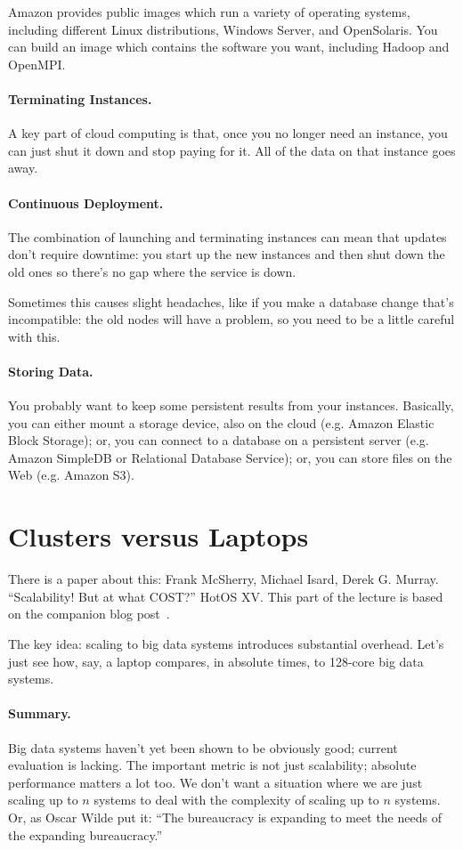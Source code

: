 \documentclass[a4paper]{report}
\begin{document}
Amazon provides public images which run a variety of operating
systems, including different Linux distributions, Windows Server, and
OpenSolaris. You can build an image which contains the software you
want, including Hadoop and OpenMPI.

\paragraph{Terminating Instances.} A key part of cloud computing is
that, once you no longer need an instance, you can just shut it down
and stop paying for it. All of the data on that instance goes away.

\paragraph{Continuous Deployment.} The combination of launching and terminating instances can mean that updates don't require downtime: you start up the new instances and then shut down the old ones so there's no gap where the service is down.

Sometimes this causes slight headaches, like if you make a database change that's incompatible: the old nodes will have a problem, so you need to be a little careful with this.

\paragraph{Storing Data.} You probably want to keep some persistent results
from your instances. Basically, you can either mount a storage device,
also on the cloud (e.g. Amazon Elastic Block Storage); or, you can
connect to a database on a persistent server (e.g. Amazon SimpleDB or
Relational Database Service); or, you can store files on the Web
(e.g. Amazon S3). 


\section*{Clusters versus Laptops}
There is a paper about this: Frank McSherry, Michael Isard, Derek G. Murray. ``Scalability! But at what COST?'' HotOS XV. This part of the lecture is based on the companion blog post~\cite{scalecost}.

The key idea: scaling to big data systems introduces substantial overhead. Let's just see how, say, a laptop compares, in absolute times, to 128-core big data systems.

\paragraph{Summary.} Big data systems haven't yet been shown to be obviously good; current evaluation is lacking.
The important metric is not just scalability; absolute
performance matters a lot too. We don't want a situation where we are just scaling up to $n$ systems to deal with the complexity of scaling up to $n$ systems. Or, as Oscar Wilde put it: ``The bureaucracy is expanding to meet the needs of the expanding bureaucracy.''
\end{document}
